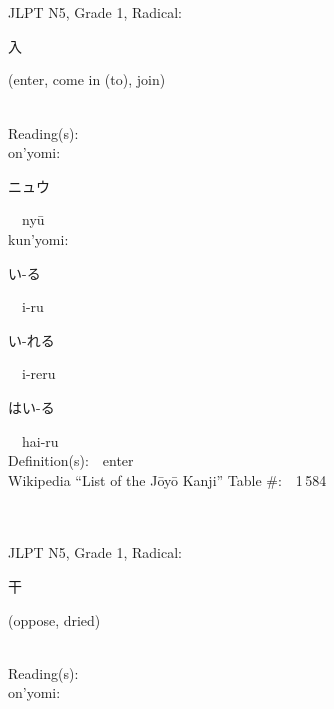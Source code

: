 \begin{multicols}{2}
\ \ \\
{\fontsize{34pt}{40pt}  }\ \ \\  %
{JLPT N5, Grade 1, Radical:\ \ {\begin{CJK}{UTF8}{min} 入 \end{CJK}} (enter, come in (to), join) } \\
Reading(s):\ \ \\
{\hspace*{1em}}on'yomi:\ \ \\
{\hspace*{2em}}{\begin{CJK}{UTF8}{min} ニュウ \end{CJK}}\ \ ny\=u\ \ \\
{\hspace*{1em}}kun'yomi:\ \ \\
{\hspace*{2em}}{\begin{CJK}{UTF8}{min} い-る \end{CJK}}\ \ i-ru\ \ \\
{\hspace*{2em}}{\begin{CJK}{UTF8}{min} い-れる \end{CJK}}\ \ i-reru\ \ \\
{\hspace*{2em}}{\begin{CJK}{UTF8}{min} はい-る \end{CJK}}\ \ hai-ru\ \ \\
Definition(s):\ \ enter \\
Wikipedia ``List of the J\=oy\=o Kanji'' Table \#:\ \ 1\,584 \\
\ \ \\
{\fontsize{34pt}{40pt}  }\ \ \\  %
{JLPT N5, Grade 1, Radical:\ \ {\begin{CJK}{UTF8}{min} 干 \end{CJK}} (oppose, dried) } \\
Reading(s):\ \ \\
{\hspace*{1em}}on'yomi:\ \ \\

\end{multicols}
